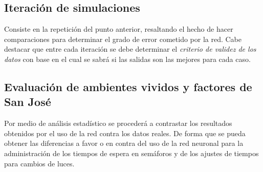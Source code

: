 \subsection{Iteraci\'{o}n de simulaciones}

	Consiste en la repetici\'{o}n del punto anterior, resaltando el hecho de hacer
	comparaciones para determinar el grado de error cometido por la red. Cabe
	destacar que entre cada iteraci\'{o}n se debe determinar el \textit{criterio
	de validez de los datos} con base en el cual se sabr\'{a} si las salidas son
	las mejores para cada caso.

\subsection{Evaluaci\'{o}n de ambientes vividos y factores de San Jos\'{e}}
	
	Por medio de an\'{a}lisis estad\'{i}stico se proceder\'{a} a contrastar los
resultados obtenidos por el uso de la red contra los datos reales. De forma que
se pueda obtener las diferencias a favor o en contra del uso de la red neuronal
para la administraci\'{o}n de los tiempos de espera en sem\'{a}foros y de los
ajustes de tiempos para cambios de luces.




